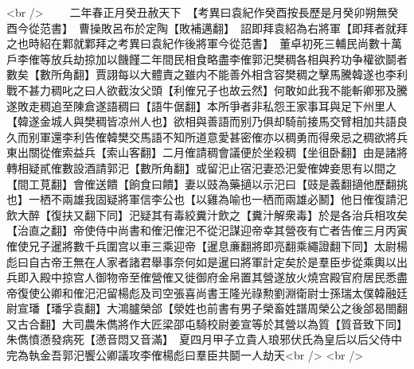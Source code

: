 <br />
　　二年春正月癸丑赦天下　【考異曰袁紀作癸酉按長歷是月癸卯朔無癸酉今從范書】　曹操敗呂布於定陶【敗補邁翻】　詔即拜袁紹為右將軍【即拜者就拜之也時紹在鄴就鄴拜之考異曰袁紀作後將軍今從范書】　董卓初死三輔民尚數十萬戶李傕等放兵劫掠加以饑饉二年間民相食略盡李傕郭汜樊稠各相與矜功争權欲鬬者數矣【數所角翻】賈詡每以大體責之雖内不能善外相含容樊稠之擊馬騰韓遂也李利戰不甚力稠叱之曰人欲截汝父頭【利傕兄子也故云然】何敢如此我不能斬卿邪及騰遂敗走稠追至陳倉遂語稠曰【語牛倨翻】本所爭者非私怨王家事耳與足下州里人【韓遂金城人與樊稠皆凉州人也】欲相與善語而别乃俱却騎前接馬交臂相加共語良久而别軍還李利告傕韓樊交馬語不知所道意愛甚密傕亦以稠勇而得衆忌之稠欲將兵東出關從傕索益兵【索山客翻】二月傕請稠會議便於坐殺稠【坐徂卧翻】由是諸將轉相疑貳傕數設酒請郭汜【數所角翻】或留汜止宿汜妻恐汜愛傕婢妾思有以間之【間工莧翻】會傕送饋【餉食曰饋】妻以豉為藥擿以示汜曰【豉是義翻擿他歷翻挑也】一栖不兩雄我固疑將軍信李公也【以雞為喻也一栖而兩雄必鬭】他日傕復請汜飲大醉【復扶又翻下同】汜疑其有毒絞糞汁飲之【糞汁解衆毒】於是各治兵相攻矣【治直之翻】帝使侍中尚書和傕汜傕汜不從汜謀迎帝幸其營夜有亡者告傕三月丙寅傕使兄子暹將數千兵圍宫以車三乘迎帝【暹息亷翻將即亮翻乘繩證翻下同】太尉楊彪曰自古帝王無在人家者諸君舉事奈何如是暹曰將軍計定矣於是羣臣步從乘輿以出兵即入殿中掠宫人御物帝至傕營傕又徙御府金帛置其營遂放火燒宫殿官府居民悉盡帝復使公卿和傕汜汜留楊彪及司空張喜尚書王隆光祿勲劉淵衛尉士孫瑞太僕韓融廷尉宣璠【璠孚袁翻】大鴻臚榮郃【滎姓也前書有男子榮畜姓譜周榮公之後郃曷閤翻又古合翻】大司農朱儁將作大匠梁邵屯騎校尉姜宣等於其營以為質【質音致下同】朱儁憤懣發病死【懣音悶又音滿】　夏四月甲子立貴人琅邪伏氏為皇后以后父侍中完為執金吾郭汜饗公卿議攻李傕楊彪曰羣臣共鬬一人劫天<br />
<br />
